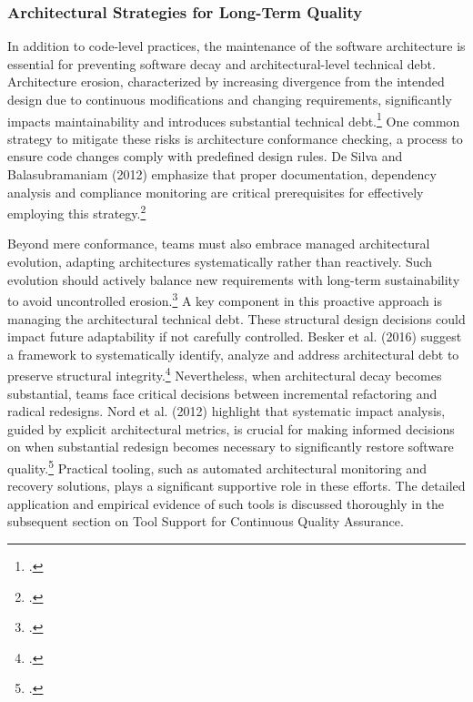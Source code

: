 \subsubsection{Architectural Strategies for Long-Term Quality}
In addition to code-level practices, the maintenance of the software architecture is essential for preventing software decay and architectural-level technical debt. 
Architecture erosion, characterized by increasing divergence from the intended design due to continuous modifications and changing requirements,
significantly impacts maintainability and introduces substantial technical debt.\footcite[1]{desilvaControllingSoftwareArchitecture2012}
One common strategy to mitigate these risks is architecture conformance checking, a process to ensure code changes comply with predefined design rules.
De Silva and Balasubramaniam (2012) emphasize that proper documentation, dependency analysis and compliance monitoring are critical prerequisites for
effectively employing this strategy.\footcite[135]{desilvaControllingSoftwareArchitecture2012}

Beyond mere conformance, teams must also embrace managed architectural evolution, adapting architectures systematically rather than reactively. Such evolution
should actively balance new requirements with long-term sustainability to avoid uncontrolled erosion.\footcite[34]{liUnderstandingSoftwareArchitecture2022}
A key component in this proactive approach is managing the architectural technical debt. These structural design decisions could impact future adaptability if not
carefully controlled. Besker et al. (2016) suggest a framework to systematically identify, analyze and address architectural debt to preserve structural integrity.\footcite[11]{beskerManagingArchitecturalTechnical2018}
Nevertheless, when architectural decay becomes substantial, teams face critical decisions between incremental refactoring and radical redesigns.
Nord et al. (2012) highlight that systematic impact analysis, guided by explicit architectural metrics, is crucial for making informed decisions on when substantial 
redesign becomes necessary to significantly restore software quality.\footcite[99]{nordSearchMetricManaging2012}
Practical tooling, such as automated architectural monitoring and recovery solutions, plays a significant supportive role in these efforts. 
The detailed application and empirical evidence of such tools is discussed thoroughly in the subsequent section on Tool Support for Continuous Quality Assurance.

